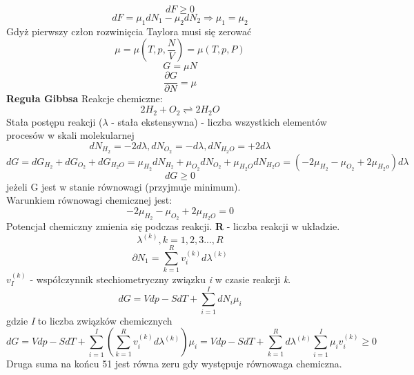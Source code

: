 \documentclass{article}
\begin{document}
		\begin{equation}
		dF \geqslant 0
		\end{equation}
		\begin{equation}
		dF = \mu_1dN_1 - \mu_2dN_2 \Rightarrow \mu_1 = \mu_2 
		\end{equation}
		Gdyż pierwszy człon rozwinięcia Taylora musi się zerować
		\begin{equation}
		\mu = \mu(T, p, \frac{N}{V}) = \mu(T, p, P)
		\end{equation}
		\begin{equation}
		G = \mu N
		\end{equation}
		\begin{equation}
		\frac{\partial G}{\partial N} = \mu
		\end{equation}
		\textbf{Reguła Gibbsa}
		Reakcje chemiczne: 
		\begin{equation}
		2H_2 + O_2 \rightleftharpoons 2H_2O
		\end{equation}
		Stała postępu reakcji ($ \lambda $ - stała ekstensywna) - liczba wszystkich elementów procesów w skali molekularnej
		\begin{equation}
		dN_{H_2} = -2d\lambda, dN_{O_2} = -d\lambda, dN_{H_2O} = +2d\lambda
		\end{equation}
		\begin{equation}
		dG = dG_{H_2} + dG_{O_2} + dG_{H_2O} =
		 \mu_{H_2}dN_{H_2} + \mu_{O_2}dN_{O_2} + \mu_{H_2O}dN_{H_2O} =
		 (-2\mu_{H_2} - \mu_{O_2} + 2\mu_{H_2o})d\lambda
		\end{equation}
		\begin{equation}
		dG \geqslant 0
		\end{equation}
		jeżeli G jest w stanie równowagi (przyjmuje minimum).\\
		Warunkiem równowagi chemicznej jest:
		\begin{equation}
		-2\mu_{H_2} - \mu_{O_2} + 2\mu_{H_2O} = 0
		\end{equation}
		Potencjał chemiczny zmienia się podczas reakcji. \textbf{R} - liczba reakcji w układzie.
		\begin{equation}
		\lambda^{(k)}, k=1,2,3...,R
		\end{equation}
		\begin{equation}
		\partial N_1 = \sum_{k=1}^{R} v_i^{(k)}d\lambda^{(k)}
		\end{equation}
		$ v_I^{(k)} $ - współczynnik stechiometryczny związku \textit{i} w czasie reakcji \textit{k}.
		\begin{equation}
		dG = Vdp - SdT + \sum_{i=1}^{I}dN_i\mu_i
		\end{equation}
		gdzie \textit{I} to liczba związków chemicznych
		\begin{equation}
		dG = Vdp - SdT + \sum_{i=1}^{I} ( \sum_{k=1}^{R} v_i^{(k)}d\lambda^{(k)} )\mu_i = 
		Vdp - SdT + \sum_{k=1}^{R}d\lambda^{(k)}
		\sum_{i=1}^{I}\mu_i v_i^{(k)} \geqslant 0
		\end{equation}
		Druga suma na końcu 51 jest równa zeru gdy występuje równowaga chemiczna.
\end{document}
